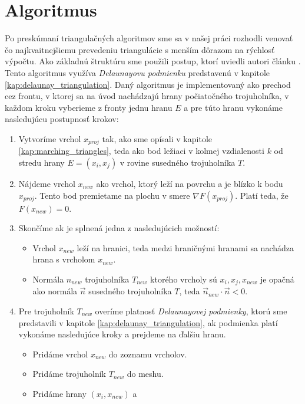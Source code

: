 \chapter{Algoritmus}
\label{kap:algoritmus}
Po preskúmaní triangulačných algoritmov sme sa v našej práci rozhodli venovať čo najkvaitnejšiemu
prevedeniu triangulácie s menším dôrazom na rýchlosť výpočtu. Ako základnú štruktúru sme použili 
postup, ktorí uviedli autori článku \cite{hilton1996marching}. Tento algoritmus využíva 
\textit{Delaunayovu podmienku} predstavenú v kapitole \ref{kap:delaunay_triangulation}.
Daný algoritmus je implementovaný ako prechod cez frontu, v ktorej sa na úvod nachádzajú
hrany počiatočného trojuholníka, v každom kroku vyberieme z fronty jednu hranu $E$ a pre túto
hranu vykonáme nasledujúcu postupnosť krokov:
\begin{enumerate}
    \item{Vytvoríme vrchol $x_{proj}$ tak, ako sme opísali v kapitole \ref{kap:marching_triangles}, teda 
    ako bod ležiaci v kolmej vzdialenosti $k$ od stredu hrany $E = (x_i, x_j)$ 
    v rovine susedného trojuholníka $T$.}
    \item{Nájdeme vrchol $x_{new}$ ako vrchol, ktorý leží na povrchu a je blízko k bodu 
    $x_{proj}$. Tento bod premietame na plochu v smere $\nabla F(x_{proj})$.
    Platí teda, že $F(x_{new}) = 0$.}
    \item{Skončíme ak je splnená jedna z nasledujúcich možností:
    \begin{itemize}
        \item{Vrchol $x_{new}$ leží na hranici, teda medzi hraničnými 
        hranami sa nachádza hrana s vrcholom $x_{new}$.}
        \item{Normála $n_{new}$ trojuholníka $T_{new}$ ktorého vrcholy sú $x_i, 
        x_j, x_{new}$ je opačná ako
        normála $\vec{n}$ susedného trojuholníka $T$, teda 
        $\vec{n}_{new} \cdot \vec{n} < 0$.}
    \end{itemize}
    }
    \item{Pre trojuholník $T_{new}$ overíme platnosť \textit{Delaunayovej podmienky}, 
    ktorú sme predstavili v kapitole \ref{kap:delaunay_triangulation}, ak podmienka platí
    vykonáme nasledujúce kroky a prejdeme na ďalšiu hranu.
    \begin{itemize}
        \item{Pridáme vrchol $x_{new}$ do zoznamu vrcholov.}
        \item{Pridáme trojuholník $T_{new}$ do meshu.}
        \item{Pridáme hrany $(x_i, x_{new})$ a 
}
\end{itemize}}
\end{enumerate}
